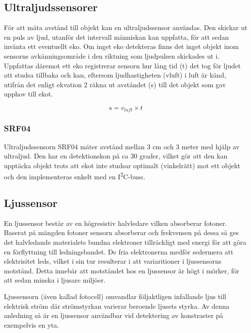 \documentclass[11pt]{article}
\begin{document}
\begin{flushleft}


\subsection{Ultraljudssensorer}
För att mäta avstånd till objekt kan en ultraljudssensor användas. Den skickar ut en puls av ljud, utanför det intervall människan kan uppfatta, för att sedan invänta ett eventuellt eko. Om inget eko detekteras finns det inget objekt inom sensorns avkänningsområde i den riktning som ljudpulsen skickades ut i. Uppfattas däremot ett eko registrerar sensorn hur lång tid (t) det tog för ljudet att studsa tillbaka och kan, eftersom ljudhastigheten (vluft) i luft är känd, utifrån det enligt ekvation 2 räkna ut avståndet (s) till det objekt som gav upphov till ekot. 

\begin{equation*}
	\textrm{s} = v_{luft} \times t						
\end{equation*}

\subsubsection{SRF04}
Ultraljudssensorn SRF04 mäter avstånd mellan 3 cm och 3 meter med hjälp av ultraljud. Den har en detektionskon på ca 30 grader, vilket gör att den kan upptäcka objekt trots att ekot inte studsar optimalt (vinkelrätt) mot ett objekt och den implementeras enkelt med en I\textsuperscript{2}C-buss.



\subsection{Ljussensor}
En ljussensor består av en högresistiv halvledare vilken absorberar fotoner. Baserat på mängden fotoner sensorn absorberar och frekvensen på dessa så ges det halvledande materialets bundna elektroner tillräckligt med energi för att göra en förflyttning till ledningsbandet. De fria elektronerna medför sedermera att elektrisitet leds,  vilket i sin tur resulterar i att variaritioner i ljussensorns motstånd. Detta innebär att motståndet hos en ljussensor är högt i mörker, för att sedan minska i ljusare miljöer.

Ljussensorn (även kallad fotocell) omvandlar följaktligen infallande ljus till elektrisk ström där strömstyrkan varierar beroende ljusets styrka. Av denna anledning så är en ljussensor användbar vid detektering av konstraster på exempelvis en yta.


\end{flushleft}
\end{document}
